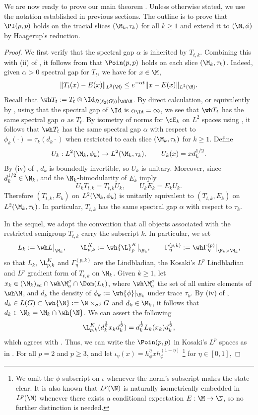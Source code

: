 \documentclass[sn-mathphys-num]{sn-jnl}
\begin{document}
We are now ready to prove our main theorem . Unless otherwise stated, we use the notation established in previous sections. The outline is to prove that $\PI(p,p)$ holds on the tracial slices $(\M_k,\tau_k)$ for all $k\ge1$ and extend it to $(\M,\phi)$ by Haagerup's reduction.
\begin{proof}
We first verify that the spectral gap $\alpha$ is inherited by $T_{t,k}$.
Combining this with (ii) of ,
it follows from  that $\Poin(p,p)$ holds on each slice $(\M_k,\tau_k)$.
Indeed, given $\alpha>0$ spectral gap for $T_t$, we have for $x\in\M$,
\[
    \|T_t(x)-E(x)\|_{L^2(\M)}\le e^{-\alpha t}\|x-E(x)\|_{L^2(\M)}.
\]
Recall that $\wh T_t:=T_t\otimes \Id_{B(\ell_2(G))}|_{\wh \M}$.
By direct calculation, or equivalently by , using that the spectral gap of $\Id$ is $\alpha_{\Id}=\infty$,
we see that $\wh T_t$ has the same spectral gap $\alpha$ as $T_t$. By isometry of norms for $\cE_k$ on $L^2$ spaces using , it follows that $\wh T_t$ has the same spectral gap $\alpha$ with respect to $\phi_k(\cdot)=\tau_k(d_k\cdot)$ when restricted to each slice $(\M_k,\tau_k)$ for $k\ge 1$.
Define
\[
U_k:L^2(\M_k,\phi_k)\to L^2(\M_k,\tau_k),
\qquad U_k(x)=xd_k^{1/2}.
\]
By (iv) of , $d_k$ is boundedly
invertible, so $U_k$ is unitary. Moreover, since
$d_k^{1/2}\in\N_k$,  and the
$\N_k$-bimodularity of $E_k$ imply
\[
U_kT_{t,k}=T_{t,k}U_k,
\qquad
U_kE_k=E_kU_k.
\]
Therefore $(T_{t,k},E_k)$ on $L^2(\M_k,\phi_k)$ is
unitarily equivalent to $(T_{t,k},E_k)$ on
$L^2(\M_k,\tau_k)$. In particular, $T_{t,k}$ has the
same spectral gap $\alpha$ with respect to $\tau_k$.


In the sequel, we adopt the convention that all objects associated with the restricted semigroup $T_{t,k}$ carry the subscript $k$.  In particular, we set
\[
L_k  := \wh L\bigl|_{\M_k},
\qquad
\L_{p,k}^{K}:=\wh{\L}^{K}_p\bigl|_{\M_k},
\qquad
\Gamma^{(p,k)}_{\eta}
 := \wh\Gamma^{(p)}_{\eta}\bigl|_{\M_k\times\M_k},
\]
so that $L_k$, $\L^K_{p,k}$ and $\Gamma^{(p,k)}_{\eta}$ are the Lindbladian, the Kosaki's $L^p$ Lindbladian and $L^p$ gradient form of $T_{t,k}$ on $\M_k$.
Given $k\ge1$, let $x_k\in (\M_{k})_{sa}\cap\wh\M_a^{\sigma}\cap \Dom(L_k)$, where $\wh \M_{a}^{\sigma}$ the set of all entire elements of $\wh \M$, and $d_k$ the density of $\phi_k:=\wh{\phi}|_{\M_k}$ under trace $\tau_k$. By (iv) of , $d_k\in L(G)\subset\wh{\N}:=\N \rtimes_{\sigma^\phi}G$ and $d_k\in \M_k$, it follows that $d_k\in \N_k=\M_k\cap\wh{\N}$. We can assert the following
    \[
        \L_{p,k}^K(d_k^{\frac{1}{2}} x_kd_k^{\frac{1}{2}})= d_k^{\frac{1}{2}}L_k(x_k)d_k^{\frac{1}{2}},
    \]
which agrees with . Thus, we can write the $\Poin(p,p)$ in Kosaki's $L^p$ spaces as in .
For all $p = 2$ and $p \ge 3$, and let $\iota_\eta(x)=h_\phi^{\eta} x h_\phi^{(1-\eta)}$ \footnote{We omit the $\phi$-subscript on $\iota$ whenever the norm's subscript makes the state clear.
It is also known that $L^p(\N)$ is naturally isometrically embedded in $L^p(\M)$
\cite{Junge_Xu_2003} whenever there exists a conditional expectation $E:\M\to\N$,
so no further distinction is needed.} for $\eta\in[0,1]$,


\end{proof}
\end{document}
